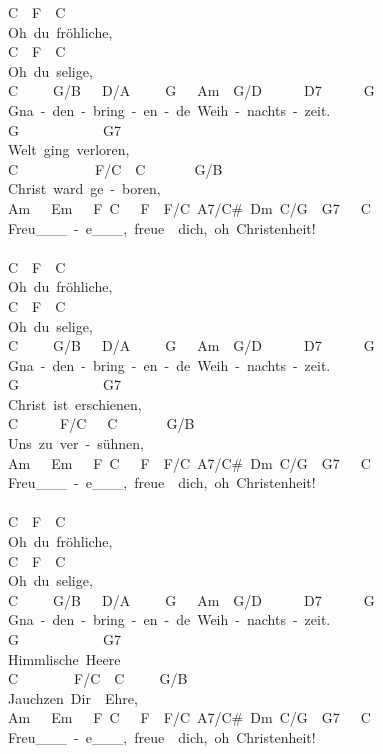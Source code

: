 \documentclass[]{book}
\begin{document}
C~~F~~C~~~~~\\
Oh~du~fröhliche,\\
C~~F~~C~~~\\
Oh~du~selige,\\
C~~~~~G/B~~~D/A~~~~~G~~~Am~~G/D~~~~~~D7~~~~~~G~~~\\
Gna~-~den~-~bring~-~en~-~de~Weih~-~nachts~-~zeit.\\
G~~~~~~~~~~~~G7~~~\\
Welt~ging~verloren,\\
C~~~~~~~~~~~F/C~~C~~~~~~~G/B\\
Christ~ward~ge~-~boren,\\
Am~~~Em~~~F~C~~~F~~F/C~A7/C\#~Dm~C/G~~G7~~~C~~~~\\
Freu\_\_\_~-~e\_\_\_,~freue~~dich,~oh~Christenheit!\\
~\\
C~~F~~C~~~~~\\
Oh~du~fröhliche,\\
C~~F~~C~~~\\
Oh~du~selige,\\
C~~~~~G/B~~~D/A~~~~~G~~~Am~~G/D~~~~~~D7~~~~~~G~~~\\
Gna~-~den~-~bring~-~en~-~de~Weih~-~nachts~-~zeit.\\
G~~~~~~~~~~~~G7~~~\\
Christ~ist~erschienen,\\
C~~~~~~F/C~~~C~~~~~~~G/B\\
Uns~zu~ver~-~sühnen,\\
Am~~~Em~~~F~C~~~F~~F/C~A7/C\#~Dm~C/G~~G7~~~C~~~~\\
Freu\_\_\_~-~e\_\_\_,~freue~~dich,~oh~Christenheit!\\
~\\
C~~F~~C~~~~~\\
Oh~du~fröhliche,\\
C~~F~~C~~~\\
Oh~du~selige,\\
C~~~~~G/B~~~D/A~~~~~G~~~Am~~G/D~~~~~~D7~~~~~~G~~~\\
Gna~-~den~-~bring~-~en~-~de~Weih~-~nachts~-~zeit.\\
G~~~~~~~~~~~~G7~~~\\
Himmlische~Heere\\
C~~~~~~~~F/C~~C~~~~~G/B\\
Jauchzen~Dir~~Ehre,\\
Am~~~Em~~~F~C~~~F~~F/C~A7/C\#~Dm~C/G~~G7~~~C~~~~\\
Freu\_\_\_~-~e\_\_\_,~freue~~dich,~oh~Christenheit!\\
~\\
\end{document}
